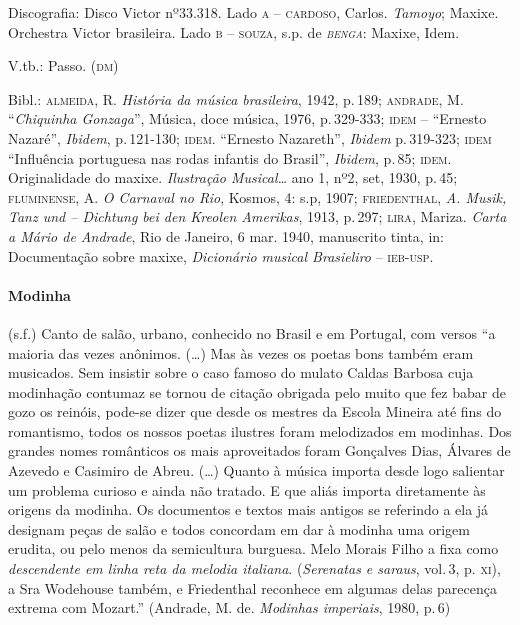 Discografia: Disco Victor nº33.318. Lado \textsc{a} -- \textsc{cardoso}, Carlos.
\textit{Tamoyo}; Maxixe. Orchestra Victor brasileira. Lado \textsc{b} -- \textsc{souza},
s.p. de \textit{\textsc{benga}}: Maxixe, Idem.

V.tb.: Passo. (\textsc{dm})

Bibl.: \textsc{almeida}, R. \textit{História da música brasileira}, 1942, p.\,189;
\textsc{andrade}, M. ``\textit{Chiquinha Gonzaga}'', Música, doce música, 1976,
p.\,329-333; \textsc{idem} -- ``Ernesto Nazaré'', \textit{Ibidem}, p.\,121-130; \textsc{idem}.
``Ernesto Nazareth'', \textit{Ibidem} p.\,319-323; \textsc{idem} ``Influência portuguesa
nas rodas infantis do Brasil'', \textit{Ibidem}, p.\,85; \textsc{idem}. Originalidade
do maxixe. \textit{Ilustração Musical\ldots{}} ano 1, nº2, set, 1930, p.\,45;
\textsc{fluminense}, A. \textit{O Carnaval no Rio}, Kosmos, 4: s.p, 1907;
\textsc{friedenthal}, \textit{A. Musik, Tanz und -- Dichtung bei den Kreolen
Amerikas}, 1913, p.\,297; \textsc{lira}, Mariza. \textit{Carta a Mário de Andrade},
Rio de Janeiro, 6 mar. 1940, manuscrito tinta, in: Documentação sobre
maxixe, \textit{Dicionário musical Brasieliro} -- \textsc{ieb-usp}.

\paragraph{Modinha} (s.f.) Canto de salão, urbano, conhecido no Brasil e
em Portugal, com versos ``a maioria das vezes anônimos. (\ldots{}) Mas às
vezes os poetas bons também eram musicados. Sem insistir sobre o caso
famoso do mulato Caldas Barbosa cuja modinhação contumaz se tornou de
citação obrigada pelo muito que fez babar de gozo os reinóis, pode-se
dizer que desde os mestres da Escola Mineira até fins do romantismo,
todos os nossos poetas ilustres foram melodizados em modinhas. Dos
grandes nomes românticos os mais aproveitados foram Gonçalves Dias,
Álvares de Azevedo e Casimiro de Abreu. (\ldots{}) Quanto à música importa
desde logo salientar um problema curioso e ainda não tratado. E que
aliás importa diretamente às origens da modinha. Os documentos e textos
mais antigos se referindo a ela já designam peças de salão e todos
concordam em dar à modinha uma origem erudita, ou pelo menos da
semicultura burguesa. Melo Morais Filho a fixa como \textit{descendente em
linha reta da melodia italiana}. (\emph{Serenatas e saraus}, vol.\,3, p.
\textsc{xi}), a Sra Wodehouse também, e Friedenthal reconhece em algumas delas
parecença extrema com Mozart.'' (Andrade, M. de. \textit{Modinhas
imperiais}, 1980, p.\,6)

